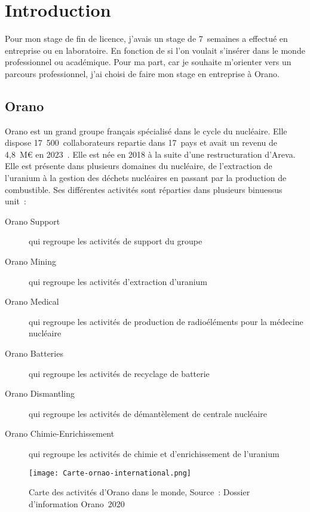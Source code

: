 \section{Introduction}

Pour mon stage de fin de licence, j'avais un stage de 7~semaines a effectué en entreprise ou en laboratoire. En fonction de si l'on voulait s'insérer dans le monde professionnel ou académique. Pour ma part, car je souhaite  m'orienter vers un parcours professionnel, j'ai choisi de faire mon stage en entreprise à Orano. %
\subsection{Orano}
Orano est un grand groupe français spécialisé dans le cycle du nucléaire. Elle dispose 17~500~collaborateurs repartie dans 17~pays et avait un revenu de 4,8~M€ en 2023~\cite{report:rapport_activiter}. Elle est née en 2018 à la suite d'une restructuration d'Areva. Elle est présente dans plusieurs domaines du nucléaire, de l'extraction de l'uranium à la gestion des déchets nucléaires en passant par la production de combustible. Ses différentes activités sont réparties dans plusieurs binuessus unit~:
\begin{description}
    \item [Orano Support] qui regroupe les activités de support du groupe
    \item [Orano Mining]qui regroupe les activités d'extraction d'uranium
    \item [Orano Medical]qui regroupe les activités de production de radioéléments pour la médecine nucléaire
    \item [Orano Batteries]qui regroupe les activités de recyclage de batterie
    \item [Orano Dismantling]qui regroupe les activités de démantèlement de centrale nucléaire
    \item [Orano Chimie-Enrichissement]qui regroupe les activités de chimie et d'enrichissement de l'uranium
\end{description}
\begin{figure}
    \centering
    \texttt{[image: Carte-ornao-international.png]}
    \caption[Carte des activités d’Orano dans le monde]{Carte des activités d’Orano dans le monde, Source~: Dossier d’information Orano~2020}
    \label{fig_carte_orano}
\end{figure}









